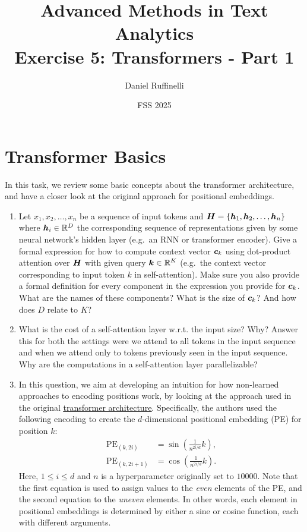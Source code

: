 \documentclass[11pt,a4paper]{article}
\title{Advanced Methods in Text Analytics \\ 
Exercise 5: Transformers - Part 1}
\author{Daniel Ruffinelli}
\date{FSS 2025}
\begin{document}
\maketitle

\section{Transformer Basics}

In this task, we review some basic concepts about the transformer architecture,
and have a closer look at the original approach for positional embeddings.

\begin{enumerate}[label=(\alph*)]
    \item Let $x_1,x_2,\ldots, x_n$ be a sequence of input tokens and
          ${\boldsymbol{H}} = \{{\boldsymbol{h}}_1,{\boldsymbol{h}}_2,\ldots, {\boldsymbol{h}}_n\}$ where ${\boldsymbol{h}}_i\in\mathbb{R}^D$ the
          corresponding sequence of representations given by some neural
          network's hidden layer (e.g.\ an RNN or transformer encoder).
          Give a formal expression for how to compute context vector ${\boldsymbol{c}}_k$
          using dot-product attention over ${\boldsymbol{H}}$ with given query
          ${\boldsymbol{k}}\in\mathbb{R}^K$ (e.g.\ the context vector corresponding to input
          token $k$ in self-attention).
          Make sure you also provide a formal definition for every component in
          the expression you provide for ${\boldsymbol{c}}_k$.
          What are the names of these components? What is the size of ${\boldsymbol{c}}_k$?
          And how does $D$ relate to $K$?
    \item What is the cost of a self-attention layer w.r.t. the input size?
          Why? Answer this for both the settings were we attend to all tokens in
          the input sequence and when we attend only to tokens previously seen
          in the input sequence.
          Why are the computations in a self-attention layer parallelizable?
    \item In this question, we aim at developing an intuition for how
          non-learned approaches to encoding positions work, by looking at the
          approach used in the original
          \href{https://arxiv.org/pdf/1706.03762.pdf}{\underline{transformer architecture}}.
          Specifically, the authors used the following encoding to create the
          $d$-dimensional positional embedding (PE) for position $k$:
          \begin{align*}
              \operatorname{PE}_{(k,2i)}   & = \sin\left(\frac{1}{n^{2i/d}}k\right), \\
              \operatorname{PE}_{(k,2i+1)} & = \cos\left(\frac{1}{n^{2i/d}}k\right).
          \end{align*}
          Here, $1\leq i \leq d$ and $n$ is a hyperparameter originally
          set to $10000$.
          Note that the first equation is used to assign values to the
          \emph{even} elements of the PE, and the second equation to the
          \emph{uneven} elements.
          In other words, each element in positional embeddings is determined
          by either a sine or cosine function, each with different arguments.


\end{enumerate}
\end{document}
